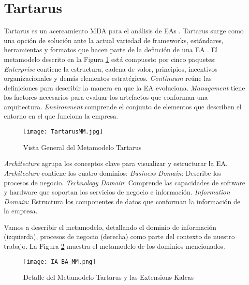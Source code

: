 \section{Tartarus} \label{subsec:tartarus}


Tartarus es un acercamiento MDA para el an\'alisis de EAs \cite{Moosas:2011}. Tartarus surge como una opci\'on de soluci\'on ante la actual variedad de frameworks, est\'andares, herramientas y formatos que hacen parte de la definci\'on de una EA \cite{Rodriguez:2011}. El metamodelo descrito en la Figura \ref{fig:Tartarus-MM} est\'a compuesto por cinco paquetes: \textit{Enterprise} contiene la estructura, cadena de valor, principios, incentivos organizacionales y dem\'as elementos estrat\'egicos. \textit{Continuum} re\'une las definiciones para describir la manera en que la EA evoluciona. \textit{Management} tiene los factores necesarios para evaluar los artefactos que conforman una arquitectura. \textit{Environment} comprende el conjunto de elementos que describen el entorno en el que funciona la empresa. 

\begin{figure}[!t]
\begin{center}
	\texttt{[image: TartarusMM.jpg]}
	\caption{Vista General del Metamodelo Tartarus}
	\label{fig:Tartarus-MM}
\end{center}
\end{figure}

\textit{Architecture} agrupa los conceptos clave para visualizar y estructurar la EA. \textit{Architecture} contiene los cuatro dominios: \textit{Business Domain}: Describe los procesos de negocio. \textit{Technology Domain}: Comprende las capacidades de software y hardware que soportan los servicios de negocio e informaci\'on. \textit{Information Domain}: Estructura los componentes de datos que conforman la informaci\'on de la empresa.

Vamos a describir el metamodelo, detallando el dominio de informaci\'on (izquierda), procesos de negocio (derecha) como parte del contexto de nuestro trabajo. La Figura \ref{fig:BA-IA-MM} muestra el metamodelo de los dominios mencionados.

\begin{landscape}

\begin{figure}[!t]
\begin{center}
	\texttt{[image: IA-BA\_MM.png]}
	\caption{Detalle del Metamodelo Tartarus y las Extensions  Kalcas}
	\label{fig:BA-IA-MM}
\end{center}
\end{figure}

\end{landscape}


